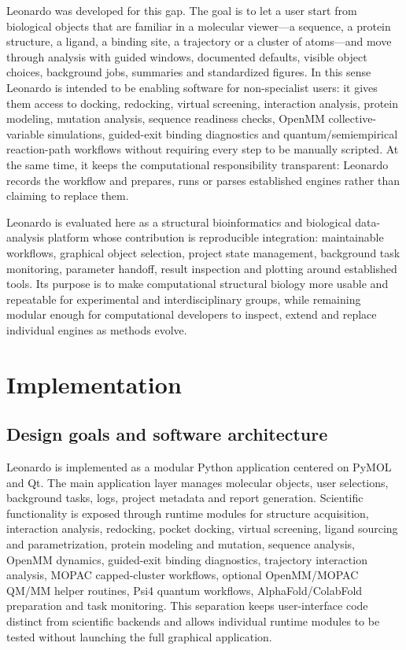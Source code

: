 \documentclass[pdflatex,sn-vancouver-num]{sn-jnl}
\begin{document}
Leonardo was developed for this gap.  The goal is to let a user start from biological objects that are familiar in a molecular viewer---a sequence, a protein structure, a ligand, a binding site, a trajectory or a cluster of atoms---and move through analysis with guided windows, documented defaults, visible object choices, background jobs, summaries and standardized figures.  In this sense Leonardo is intended to be enabling software for non-specialist users: it gives them access to docking, redocking, virtual screening, interaction analysis, protein modeling, mutation analysis, sequence readiness checks, OpenMM collective-variable simulations, guided-exit binding diagnostics and quantum/semiempirical reaction-path workflows without requiring every step to be manually scripted.  At the same time, it keeps the computational responsibility transparent: Leonardo records the workflow and prepares, runs or parses established engines rather than claiming to replace them.

Leonardo is evaluated here as a structural bioinformatics and biological data-analysis platform whose contribution is reproducible integration: maintainable workflows, graphical object selection, project state management, background task monitoring, parameter handoff, result inspection and plotting around established tools.  Its purpose is to make computational structural biology more usable and repeatable for experimental and interdisciplinary groups, while remaining modular enough for computational developers to inspect, extend and replace individual engines as methods evolve.

\section{Implementation}\label{sec:architecture}

\subsection{Design goals and software architecture}

Leonardo is implemented as a modular Python application centered on PyMOL and Qt.  The main application layer manages molecular objects, user selections, background tasks, logs, project metadata and report generation.  Scientific functionality is exposed through runtime modules for structure acquisition, interaction analysis, redocking, pocket docking, virtual screening, ligand sourcing and parametrization, protein modeling and mutation, sequence analysis, OpenMM dynamics, guided-exit binding diagnostics, trajectory interaction analysis, MOPAC capped-cluster workflows, optional OpenMM/MOPAC QM/MM helper routines, Psi4 quantum workflows, AlphaFold/ColabFold preparation and task monitoring.  This separation keeps user-interface code distinct from scientific backends and allows individual runtime modules to be tested without launching the full graphical application.
\end{document}
